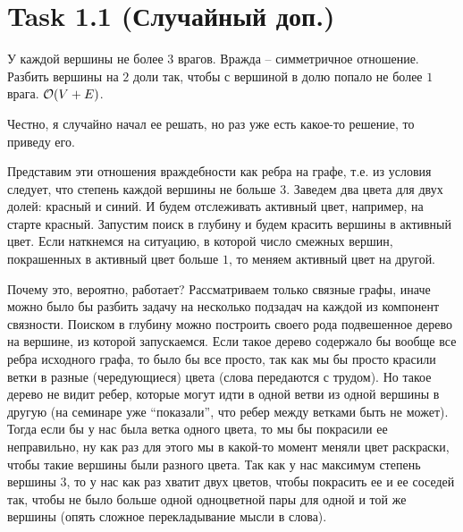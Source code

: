 \section{Task 1.1 (Случайный доп.)}
\begin{task}
    У каждой вершины не более $3$ врагов. Вражда – симметричное отношение. Разбить вершины на $2$ доли так, чтобы с вершиной в долю попало не более $1$ врага. $\mathcal{O}(V + E)$.
\end{task}

\begin{solution}
    Честно, я случайно начал ее решать, но раз уже есть какое-то решение, то приведу его.

    Представим эти отношения враждебности как ребра на графе, т.е. из условия следует, что степень каждой вершины не больше $3$.
    Заведем два цвета для двух долей: красный и синий.
    И будем отслеживать активный цвет, например, на старте красный.
    Запустим поиск в глубину и будем красить вершины в активный цвет. Если наткнемся на ситуацию, в которой число смежных вершин, покрашенных в активный цвет больше $1$, то меняем активный цвет на другой.

    Почему это, вероятно, работает?
    Рассматриваем только связные графы, иначе можно было бы разбить задачу на несколько подзадач на каждой из компонент связности. Поиском в глубину можно построить своего рода подвешенное дерево на вершине, из которой запускаемся. Если такое дерево содержало бы вообще все ребра исходного графа, то было бы все просто, так как мы бы просто красили ветки в разные (чередующиеся) цвета (слова передаются с трудом). Но такое дерево не видит ребер, которые могут идти в одной ветви из одной вершины в другую (на семинаре уже ``показали'', что ребер между ветками быть не может). Тогда если бы у нас была ветка одного цвета, то мы бы покрасили ее неправильно, ну как раз для этого мы в какой-то момент меняли цвет раскраски, чтобы такие вершины были разного цвета. Так как у нас максимум степень вершины $3$, то у нас как раз хватит двух цветов, чтобы покрасить ее и ее соседей так, чтобы не было больше одной одноцветной пары для одной и той же вершины (опять сложное перекладывание мысли в слова).
\end{solution}